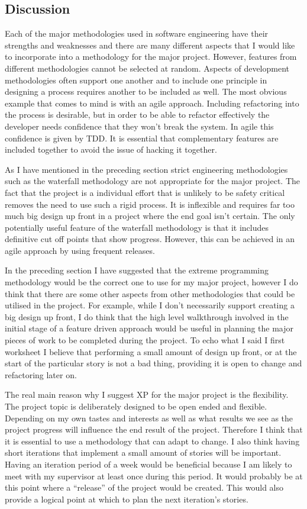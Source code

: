 \documentclass[paper=a4, fontsize=11pt]{scrartcl}	%
\numberwithin{equation}{section} %
\numberwithin{figure}{section} %
\numberwithin{table}{section}
\begin{document}
\subsection*{Discussion}
Each of the major methodologies used in software engineering have their strengths and weaknesses and there are many different aspects that I would like to incorporate into a methodology for the major project. However, features from different methodologies cannot be selected at random. Aspects of development methodologies often support one another and to include one principle in designing a process requires another to be included as well. The most obvious example that comes to mind is with an agile approach. Including refactoring into the process is desirable, but in order to be able to refactor effectively the developer needs confidence that they won't break the system. In agile this confidence is given by TDD. It is essential that complementary features are included together to avoid the issue of hacking it together.

As I have mentioned in the preceding section strict engineering methodologies such as the waterfall methodology are not appropriate for the major project. The fact that the  project is a individual effort that is unlikely to be safety critical removes the need to use such a rigid process. It is inflexible and requires far too much big design up front in a project where the end goal isn't certain. The only potentially useful feature of the waterfall methodology is that it includes definitive cut off points that show progress. However, this can be achieved in an agile approach by using frequent releases.

In the preceding section I have suggested that the extreme programming methodology would be the correct one to use for my major project, however I do think that there are some other aspects from other methodologies that could be utilised in the project. For example, while I don't necessarily support creating a big design up front, I do think that the high level walkthrough involved in the initial stage of a feature driven approach would be useful in planning the major pieces of work to be completed during the project. To echo what I said I first worksheet I believe that performing a small amount of design up front, or at the start of the particular story is not a bad thing, providing it is open to change and refactoring later on.

The real main reason why I suggest XP for the major project is the flexibility. The project topic is deliberately designed to be open ended and flexible. Depending on my own tastes and interests as well as what results we see as the project progress will influence the end result of the project. Therefore I think that it is essential to use a methodology that can adapt to change. I also think having short iterations that implement a small amount of stories will be important. Having an iteration period of a week would be beneficial because I am likely to meet with my supervisor at least once during this period. It would probably be at this point where a ``release'' of the project would be created. This would also provide a logical point at which to plan the next iteration's stories.
\end{document}
